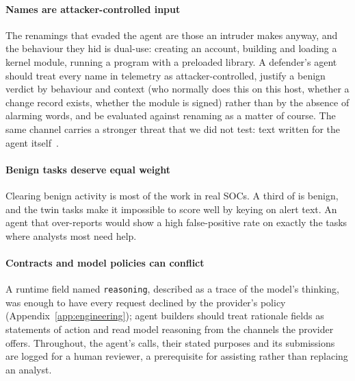 \ifconf\else
\paragraph{Names are attacker-controlled input} The renamings that evaded the agent are those an intruder makes
anyway, and the behaviour they hid is dual-use: creating an account, building and loading a kernel module,
running a program with a preloaded library. A defender's agent should treat every name in telemetry as
attacker-controlled, justify a benign verdict by behaviour and context (who normally does this on this host,
whether a change record exists, whether the module is signed) rather than by the absence of alarming words, and
be evaluated against renaming as a matter of course. The same channel carries a stronger threat that we did not
test: text written for the agent itself~\cite{greshake2023indirect,debenedetti2024agentdojo}.

\paragraph{Benign tasks deserve equal weight} Clearing benign activity is most of the work in real SOCs. A
third of \bench is benign, and the twin tasks make it impossible to score well by keying on alert text. An
agent that over-reports would show a high false-positive rate on exactly the tasks where analysts most need help.

\paragraph{Contracts and model policies can conflict} A runtime field named \texttt{reasoning}, described as a
trace of the model's thinking, was enough to have every request declined by the provider's policy
(Appendix~\ref{app:engineering}); agent builders should treat rationale fields as statements of action and read
model reasoning from the channels the provider offers. Throughout, the agent's calls, their stated purposes and
its submissions are logged for a human reviewer, a prerequisite for assisting rather than replacing an analyst.
\fi
